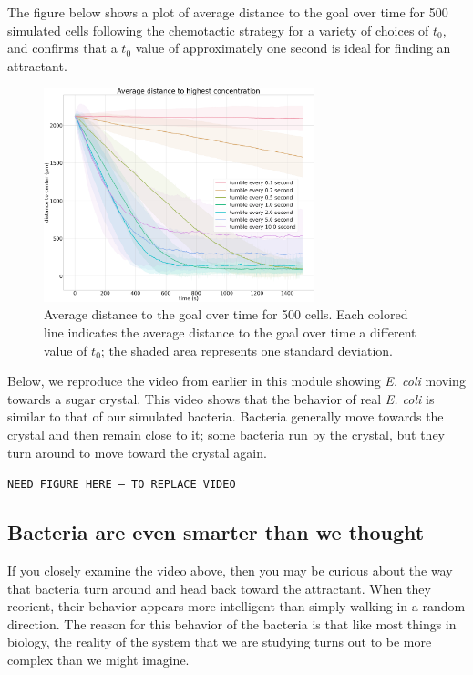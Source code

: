 The figure below shows a plot of average distance to the goal over time for 500 simulated cells following the chemotactic strategy for a variety of choices of $t_0$, and confirms that a $t_0$ value of approximately one second is ideal for finding an attractant.


\begin{figure}[h]
\centering
\mySfFamily
\includegraphics[width = 0.7\textwidth]{../images/chemotaxis_performance_uniform.png}
\caption{Average distance to the goal over time for 500 cells. Each colored line indicates the average distance to the goal over time a different value of $t_0$; the shaded area represents one standard deviation.}
\label{fig:chemotaxis_performance_uniform}
\end{figure}


Below, we reproduce the video from earlier in this module showing \textit{E. coli} moving towards a sugar crystal. This video shows that the behavior of real \textit{E. coli} is similar to that of our simulated bacteria. Bacteria generally move towards the crystal and then remain close to it; some bacteria run by the crystal, but they turn around to move toward the crystal again.

\texttt{NEED FIGURE HERE -- TO REPLACE VIDEO}\\


\FloatBarrier
{}
{}
\subsection{Bacteria are even smarter than we thought}

If you closely examine the video above, then you may be curious about the way that bacteria turn around and head back toward the attractant. When they reorient, their behavior appears more intelligent than simply walking in a random direction. The reason for this behavior of the bacteria is that like most things in biology, the reality of the system that we are studying turns out to be more complex than we might imagine.

